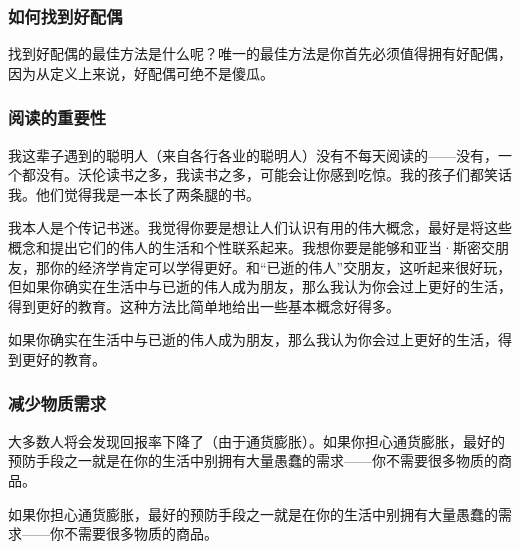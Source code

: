 \subsubsection*{如何找到好配偶}

找到好配偶的最佳方法是什么呢？唯一的最佳方法是你首先必须值得拥有好配偶，因为从定义上来说，好配偶可绝不是傻瓜。
\par

\subsubsection*{阅读的重要性}

我这辈子遇到的聪明人（来自各行各业的聪明人）没有不每天阅读的——没有，一个都没有。沃伦读书之多，我读书之多，可能会让你感到吃惊。我的孩子们都笑话我。他们觉得我是一本长了两条腿的书。
\par

我本人是个传记书迷。我觉得你要是想让人们认识有用的伟大概念，最好是将这些概念和提出它们的伟人的生活和个性联系起来。我想你要是能够和亚当·斯密交朋友，那你的经济学肯定可以学得更好。和“已逝的伟人”交朋友，这听起来很好玩，但如果你确实在生活中与已逝的伟人成为朋友，那么我认为你会过上更好的生活，得到更好的教育。这种方法比简单地给出一些基本概念好得多。
\par

\begin{WisdomBox}
\par

如果你确实在生活中与已逝的伟人成为朋友，那么我认为你会过上更好的生活，得到更好的教育。
\par
\end{WisdomBox}

\subsubsection*{减少物质需求}

大多数人将会发现回报率下降了（由于通货膨胀）。如果你担心通货膨胀，最好的预防手段之一就是在你的生活中别拥有大量愚蠢的需求——你不需要很多物质的商品。
\par

\begin{WisdomBox}
\par

如果你担心通货膨胀，最好的预防手段之一就是在你的生活中别拥有大量愚蠢的需求——你不需要很多物质的商品。
\par
\end{WisdomBox}

